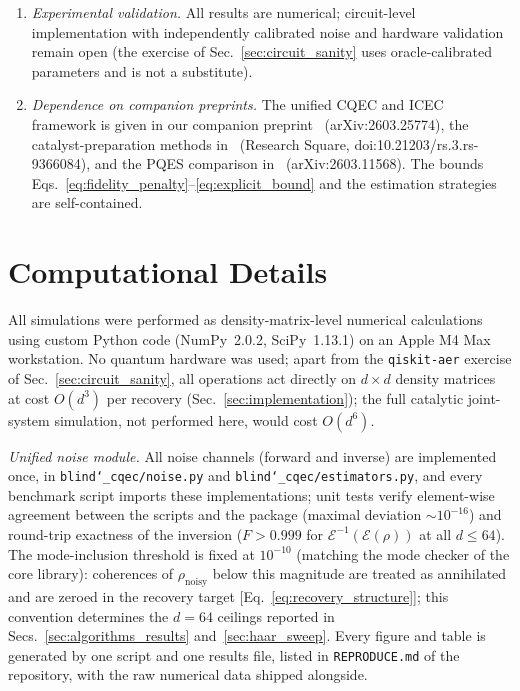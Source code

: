\documentclass[a4paper,onecolumn]{quantumarticle}
\newcommand{\EE}{\mathcal{E}}
\newcommand{\rhon}{\rho_\mathrm{noisy}}
\begin{document}
\begin{enumerate}
\item \emph{Experimental validation.}
All results are numerical; circuit-level implementation with independently calibrated noise and hardware validation remain open (the exercise of Sec.~\ref{sec:circuit_sanity} uses oracle-calibrated parameters and is not a substitute).
\item \emph{Dependence on companion preprints.}
The unified CQEC and ICEC framework is given in our companion preprint~\cite{Wakaura2026unified} (arXiv:2603.25774), the catalyst-preparation methods in~\cite{Wakaura2026catalyst} (Research Square, doi:10.21203/rs.3.rs-9366084), and the PQES comparison in~\cite{Raghoonanan2026} (arXiv:2603.11568).
The bounds Eqs.~\eqref{eq:fidelity_penalty}--\eqref{eq:explicit_bound} and the estimation strategies are self-contained.
\end{enumerate}


\section{Computational Details}
\label{sec:computational}

All simulations were performed as density-matrix-level numerical calculations using custom Python code (NumPy~2.0.2, SciPy~1.13.1) on an Apple M4 Max workstation.
No quantum hardware was used; apart from the \texttt{qiskit-aer} exercise of Sec.~\ref{sec:circuit_sanity}, all operations act directly on $d \times d$ density matrices at cost $O(d^3)$ per recovery (Sec.~\ref{sec:implementation}); the full catalytic joint-system simulation, not performed here, would cost $O(d^6)$.

\emph{Unified noise module.}
All noise channels (forward and inverse) are implemented once, in \texttt{blind\char`\_cqec/noise.py} and \texttt{blind\char`\_cqec/estimators.py}, and every benchmark script imports these implementations; unit tests verify element-wise agreement between the scripts and the package (maximal deviation $\sim 10^{-16}$) and round-trip exactness of the inversion ($F > 0.999$ for $\EE^{-1}(\EE(\rho))$ at all $d \leq 64$).
The mode-inclusion threshold is fixed at $10^{-10}$ (matching the mode checker of the core library): coherences of $\rhon$ below this magnitude are treated as annihilated and are zeroed in the recovery target [Eq.~\eqref{eq:recovery_structure}]; this convention determines the $d = 64$ ceilings reported in Secs.~\ref{sec:algorithms_results} and~\ref{sec:haar_sweep}.
Every figure and table is generated by one script and one results file, listed in \texttt{REPRODUCE.md} of the repository, with the raw numerical data shipped alongside.
\end{document}
